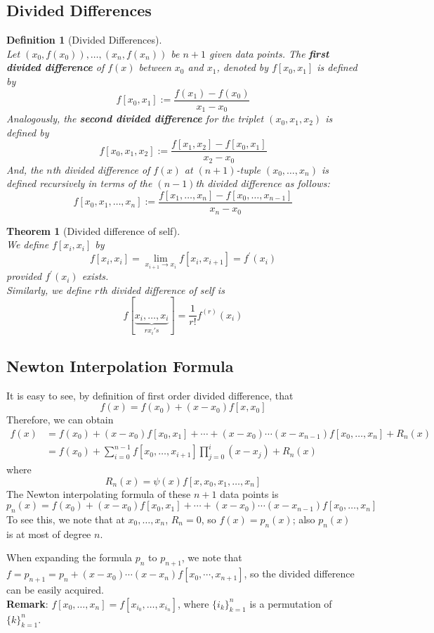 \documentclass[12pt]{article}
\newtheorem{definition}{Definition}[section]
\newtheorem{theorem}{Theorem}[section]
\theoremstyle{definition}
\begin{document}
\subsection{Divided Differences}
\begin{definition}[Divided Differences]
\hfill\\\normalfont Let $(x_0,f(x_0)), \ldots, (x_n,f(x_n))$ be $n+1$ given data points. The \textbf{first divided difference} of $f(x)$ between $x_0$ and $x_1$, denoted by $f[x_0,x_1]$ is defined by
\[
f[x_0,x_1]:=\frac{f(x_1)-f(x_0)}{x_1-x_0}
\]
Analogously, the \textbf{second divided difference} for the triplet $(x_0,x_1,x_2)$ is defined by
\[
f[x_0,x_1,x_2]:=\frac{f[x_1,x_2]-f[x_0,x_1]}{x_2-x_0}
\]
And, the $n$th divided difference of $f(x)$ at $(n+1)$-tuple $(x_0,\ldots, x_n)$ is defined recursively in terms of the $(n-1)$th divided difference as follows:
\[
f[x_0,x_1,\ldots, x_n]:=\frac{f[x_1,\ldots, x_n]-f[x_0,\ldots, x_{n-1}]}{x_n-x_0}
\]
\end{definition}
\begin{theorem}[Divided difference of self]
\hfill\\\normalfont We define $f[x_i,x_i]$ by
\[
f[x_i,x_i] = \lim_{x_{i+1}\to x_i}f[x_i,x_{i+1}] = f^\prime(x_i)
\]
provided $f^\prime(x_i)$ exists.\\
Similarly, we define $r$th divided difference of self is
\[
f[\underbrace{x_i,\ldots, x_i}_{r x_i's}] = \frac{1}{r!}f^{(r)}(x_i)
\]
\end{theorem}
\subsection{Newton Interpolation Formula}
It is easy to see, by definition of first order divided difference, that
\[
f(x) = f(x_0)+(x-x_0)f[x,x_0]
\]
Therefore, we can obtain
\begin{align*}
f(x) &= f(x_0)+(x-x_0)f[x_0,x_1]+\cdots +(x-x_0)\cdots(x-x_{n-1})f[x_0,\ldots, x_n]+R_n(x)\\
&=f(x_0)+\sum_{i=0}^{n-1}f[x_0,\ldots, x_{i+1}]\prod_{j=0}^i (x-x_j)+R_n(x)
\end{align*}
where
\[
R_n(x) = \psi(x)f[x,x_0,x_1,\ldots, x_n]
\]
The Newton interpolating formula of these $n+1$ data points is 
\[
p_n(x) = f(x_0)+(x-x_0)f[x_0,x_1]+\cdots +(x-x_0)\cdots(x-x_{n-1})f[x_0,\ldots, x_n]
\]
To see this, we note that at $x_0, \ldots, x_n$, $R_n=0$, so $f(x) = p_n(x)$; also $p_n(x)$ is at most of degree $n$.

When expanding the formula $p_n$ to $p_{n+1}$, we note that $f = p_{n+1} = p_n + (x-x_0)\cdots(x-x_n)f[x_0,\cdots, x_{n+1}]$, so the divided difference can be easily acquired.\\

\textbf{Remark}: $f[x_0,\ldots,x_n] = f[x_{i_0},\ldots, x_{i_n}]$, where $\{i_k\}_{k=1}^n$ is a permutation of $\{k\}_{k=1}^n$.
\end{document}
